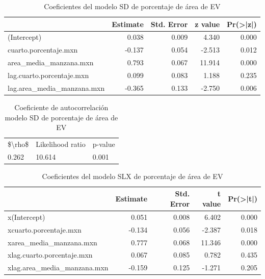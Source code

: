 \documentclass[12pt,]{book}
\begin{document}
\begin{table}

\caption{\label{tab:coef-sd-areaep}Coeficientes del modelo SD de porcentaje de área de EV}
\centering
\begin{tabular}[t]{lrrrr}
\toprule
  & Estimate & Std. Error & z value & Pr(>|z|)\\
\midrule
(Intercept) & 0.038 & 0.009 & 4.340 & 0.000\\
cuarto.porcentaje.mxn & -0.137 & 0.054 & -2.513 & 0.012\\
area\_media\_manzana.mxn & 0.793 & 0.067 & 11.914 & 0.000\\
lag.cuarto.porcentaje.mxn & 0.099 & 0.083 & 1.188 & 0.235\\
lag.area\_media\_manzana.mxn & -0.365 & 0.133 & -2.750 & 0.006\\
\bottomrule
\end{tabular}
\end{table}

\begin{table}

\caption{\label{tab:cauto-sd-areaep}Coeficiente de autocorrelación modelo SD de porcentaje de área de EV}
\centering
\begin{tabular}[t]{lll}
\toprule
\$\textbackslash{}rho\$ & Likelihood ratio & p-value\\
0.262 & 10.614 & 0.001\\
\bottomrule
\end{tabular}
\end{table}

\begin{table}

\caption{\label{tab:coef-slx-areaep}Coeficientes del modelo SLX de porcentaje de área de EV}
\centering
\begin{tabular}[t]{lrrrr}
\toprule
  & Estimate & Std. Error & t value & Pr(>|t|)\\
\midrule
x(Intercept) & 0.051 & 0.008 & 6.402 & 0.000\\
xcuarto.porcentaje.mxn & -0.134 & 0.056 & -2.387 & 0.018\\
xarea\_media\_manzana.mxn & 0.777 & 0.068 & 11.346 & 0.000\\
xlag.cuarto.porcentaje.mxn & 0.067 & 0.085 & 0.782 & 0.435\\
xlag.area\_media\_manzana.mxn & -0.159 & 0.125 & -1.271 & 0.205\\
\bottomrule
\end{tabular}
\end{table}
\end{document}
